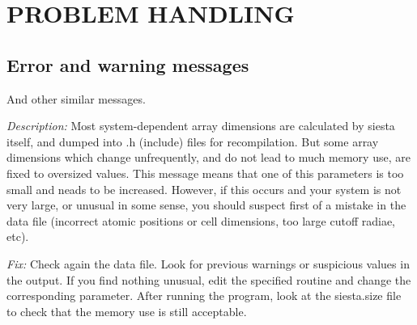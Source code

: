 \section{PROBLEM HANDLING}

\subsection{Error and warning messages}

\begin{description}
\itemsep 10pt
\parsep 0pt

\item[{\tt chkdim: ERROR: In {\it routine} dimension {\it parameter} =
{\it value}. It must be  ...}]

And other similar messages.

{\it Description:}
Most system-dependent array dimensions are calculated by siesta itself,
and dumped into .h (include) files for recompilation.
But some array dimensions which change unfrequently, and do not lead to
much memory use, are fixed to oversized values. This message means that
one of this parameters is too small and neads to be increased.
However, if this occurs and your system is not very large, or unusual in
some sense, you should suspect first of a mistake in the data file (incorrect
atomic positions or cell dimensions, too large cutoff radiae, etc).

{\it Fix:}
Check again the data file. 
Look for previous warnings or suspicious values in the output.
If you find nothing unusual, edit the specified routine and change the 
corresponding parameter.
After running the program, look at the siesta.size file to check that
the memory use is still acceptable.

% 
% 


\end{description}
